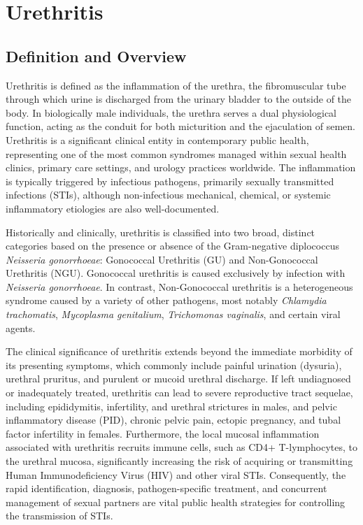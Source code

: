\chapter{Urethritis}

\section*{Definition and Overview}
Urethritis is defined as the inflammation of the urethra, the fibromuscular tube through which urine is discharged from the urinary bladder to the outside of the body. In biologically male individuals, the urethra serves a dual physiological function, acting as the conduit for both micturition and the ejaculation of semen. Urethritis is a significant clinical entity in contemporary public health, representing one of the most common syndromes managed within sexual health clinics, primary care settings, and urology practices worldwide. The inflammation is typically triggered by infectious pathogens, primarily sexually transmitted infections (STIs), although non-infectious mechanical, chemical, or systemic inflammatory etiologies are also well-documented.

Historically and clinically, urethritis is classified into two broad, distinct categories based on the presence or absence of the Gram-negative diplococcus \textit{Neisseria gonorrhoeae}: Gonococcal Urethritis (GU) and Non-Gonococcal Urethritis (NGU). Gonococcal urethritis is caused exclusively by infection with \textit{Neisseria gonorrhoeae}. In contrast, Non-Gonococcal urethritis is a heterogeneous syndrome caused by a variety of other pathogens, most notably \textit{Chlamydia trachomatis}, \textit{Mycoplasma genitalium}, \textit{Trichomonas vaginalis}, and certain viral agents.

The clinical significance of urethritis extends beyond the immediate morbidity of its presenting symptoms, which commonly include painful urination (dysuria), urethral pruritus, and purulent or mucoid urethral discharge. If left undiagnosed or inadequately treated, urethritis can lead to severe reproductive tract sequelae, including epididymitis, infertility, and urethral strictures in males, and pelvic inflammatory disease (PID), chronic pelvic pain, ectopic pregnancy, and tubal factor infertility in females. Furthermore, the local mucosal inflammation associated with urethritis recruits immune cells, such as CD4+ T-lymphocytes, to the urethral mucosa, significantly increasing the risk of acquiring or transmitting Human Immunodeficiency Virus (HIV) and other viral STIs. Consequently, the rapid identification, diagnosis, pathogen-specific treatment, and concurrent management of sexual partners are vital public health strategies for controlling the transmission of STIs.

